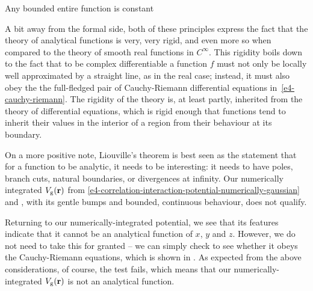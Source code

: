 \begin{mathaside}{Any bounded entire function is constant}
\hfill\qedsymbol

\vspace{\maskip}
A bit away from the formal side, both of these principles express the fact that the theory of analytical functions is very, very rigid, and even more so when compared to the theory of smooth real functions in $C^\infty$. This rigidity boils down to the fact that to be complex differentiable a function $f$ must not only be locally well approximated by a straight line, as in the real case; instead, it must also obey the the full-fledged pair of Cauchy-Riemann differential equations in~\eqref{e4-cauchy-riemann}. The rigidity of the theory is, at least partly, inherited from the theory of differential equations, which is rigid enough that functions tend to inherit their values in the interior of a region from their behaviour at its boundary.

\vspace{\maskip}
On a more positive note, Liouville's theorem is best seen as the statement that for a function to be analytic, it needs to be interesting: it needs to have poles, branch cuts, natural boundaries, or divergences at infinity. Our numerically integrated $V_\mathrm{g}(\vb{r})$ from \eqref{e4-correlation-interaction-potential-numerically-gaussian} and , with its gentle bumps and bounded, continuous behaviour, does not qualify.



\end{mathaside}



Returning to our numerically-integrated potential, we see that its features indicate that it cannot be an analytical function of $x$, $y$ and $z$. However, we do not need to take this for granted -- we can simply check to see whether it obeys the Cauchy-Riemann equations, which is shown in . As expected from the above considerations, of course, the test fails, which means that our numerically-integrated $V_\mathrm{g}(\vb{r})$ is not an analytical function.




